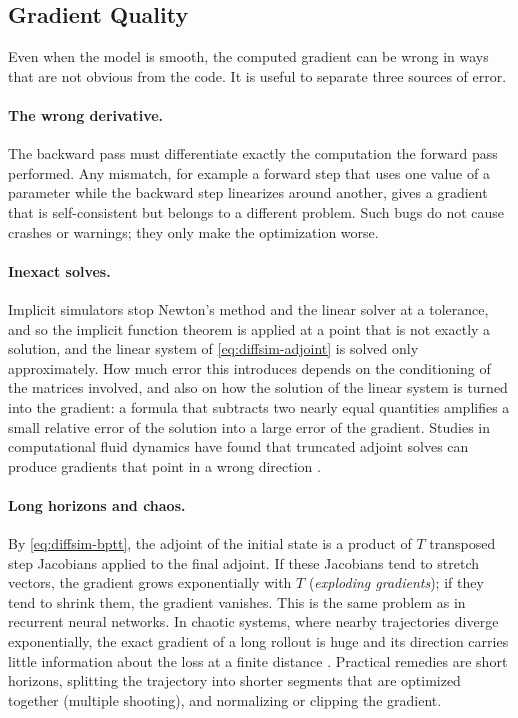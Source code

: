 \subsection{Gradient Quality}
\label{sec:diffsim-quality}

Even when the model is smooth, the computed gradient can be wrong in ways
that are not obvious from the code. It is useful to separate three
sources of error.

\paragraph{The wrong derivative.}
The backward pass must differentiate exactly the computation the forward
pass performed. Any mismatch, for example a forward step that uses one
value of a parameter while the backward step linearizes around another,
gives a gradient that is self-consistent but belongs to a different
problem. Such bugs do not cause crashes or warnings; they only make the
optimization worse.

\paragraph{Inexact solves.}
Implicit simulators stop Newton's method and the linear solver at a
tolerance, and so the implicit function theorem is applied at a point
that is not exactly a solution, and the linear system of
\eqref{eq:diffsim-adjoint} is solved only approximately. How much error
this introduces depends on the conditioning of the matrices involved, and
also on how the solution of the linear system is turned into the
gradient: a formula that subtracts two nearly equal quantities amplifies
a small relative error of the solution into a large error of the
gradient. Studies in computational fluid dynamics have found that
truncated adjoint solves can produce gradients that point in a wrong
direction \citep{akbarzadeh2020consistency}.

\paragraph{Long horizons and chaos.}
By \eqref{eq:diffsim-bptt}, the adjoint of the initial state is a product
of $T$ transposed step Jacobians applied to the final adjoint. If these
Jacobians tend to stretch vectors, the gradient grows exponentially with
$T$ (\emph{exploding gradients}); if they tend to shrink them, the
gradient vanishes. This is the same problem as in recurrent neural
networks. In chaotic systems, where nearby trajectories diverge
exponentially, the exact gradient of a long rollout is huge and its
direction carries little information about the loss at a finite distance
\citep{metz2021gradients}. Practical remedies are short horizons,
splitting the trajectory into shorter segments that are optimized
together (multiple shooting), and normalizing or clipping the gradient.

